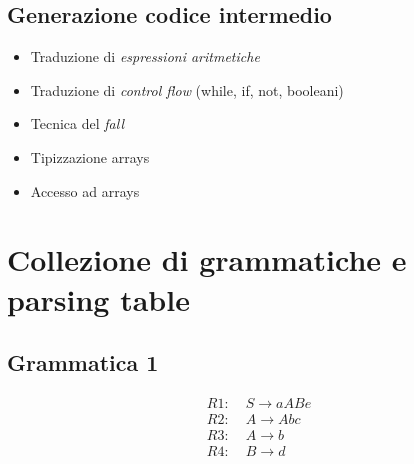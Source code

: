 \subsection{Generazione codice intermedio}
\begin{itemize}
	\item Traduzione di \textit{espressioni aritmetiche}
	\item Traduzione di \textit{control flow} (while, if, not, booleani)
	\item Tecnica del \textit{fall}
	\item Tipizzazione arrays
	\item Accesso ad arrays
\end{itemize}
\section{Collezione di grammatiche e parsing table}

\subsection{Grammatica 1}

\def\rOneLabel{R1}
\def\rOneDesc{S \to a A B e}

\def\rTwoLabel{R2}
\def\rTwoDesc{A \to A b c}

\def\rThreeLabel{R3}
\def\rThreeDesc{A \to b}

\def\rFourLabel{R4}
\def\rFourDesc{B \to d}



\begin{align*}
	\rOneLabel  :\;  & \rOneDesc   \\
	\rTwoLabel  :\;  & \rTwoDesc   \\
	\rThreeLabel :\; & \rThreeDesc \\
	\rFourLabel :\;  & \rFourDesc  \\
\end{align*}

